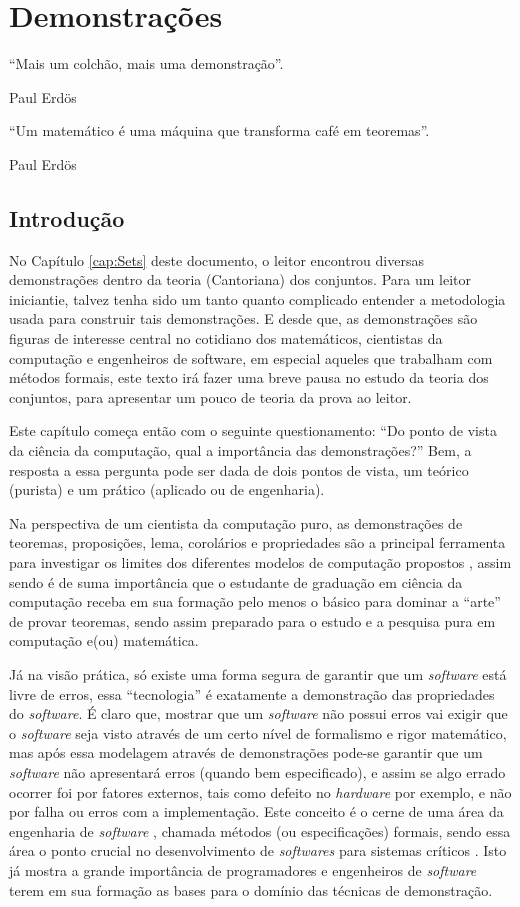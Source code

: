 \chapter{Demonstrações}\label{cap:Proofs}

\epigraph{``Mais um colchão, mais uma demonstração''.}{Paul Erdös}

\epigraph{``Um matemático é uma máquina que transforma café em teoremas''.}{Paul Erdös}

\section{Introdução}\label{sec:Introducao}

No Capítulo \ref{cap:Sets} deste documento, o leitor encontrou diversas demonstrações dentro da teoria (Cantoriana) dos conjuntos. Para um leitor iniciantie, talvez tenha sido um tanto quanto complicado entender a metodologia usada para construir tais demonstrações. E desde que, as demonstrações são figuras de interesse central no cotidiano dos matemáticos, cientistas da computação e engenheiros de software, em especial aqueles que trabalham com métodos formais, este texto irá fazer uma breve pausa no estudo da teoria dos conjuntos, para apresentar um pouco de teoria da prova ao leitor.

Este capítulo começa então com o seguinte questionamento: ``Do ponto de vista da ciência da computação, qual a importância das demonstrações?'' Bem, a resposta a essa pergunta pode ser dada de dois pontos de vista, um teórico (purista) e um prático (aplicado ou de engenharia).

Na perspectiva de um cientista da computação puro, as demonstrações de teoremas, proposições, lema, corolários e propriedades são a principal ferramenta para investigar os limites dos diferentes modelos de computação propostos \cite{hopcroft2008, linz2006}, assim sendo é de suma importância que o estudante de graduação em ciência da computação receba em sua formação pelo menos o básico para dominar a ``arte'' de provar teoremas, sendo assim preparado para o estudo e a pesquisa pura em computação e(ou) matemática.

Já na visão prática, só existe uma forma segura de garantir que um \textit{software} está livre de erros, essa ``tecnologia'' é exatamente a demonstração das propriedades do \textit{software}. É claro que, mostrar que um \textit{software} não possui erros vai exigir que o \textit{software} seja visto através de um certo nível de formalismo e rigor matemático, mas após essa modelagem através de demonstrações pode-se garantir que um \textit{software} não apresentará erros (quando bem especificado), e assim se algo errado ocorrer foi por fatores externos, tais como defeito no \textit{hardware} por exemplo, e não por falha ou erros com a implementação. Este conceito é o cerne de uma área da engenharia de \textit{software} \cite{pressman2016}, chamada métodos  (ou especificações) formais, sendo essa área o ponto crucial no desenvolvimento de \textit{softwares} para sistemas críticos \cite{sommerville2011}. Isto já mostra a grande importância de programadores e engenheiros de \textit{software} terem em sua formação as bases para o domínio das técnicas de demonstração.

